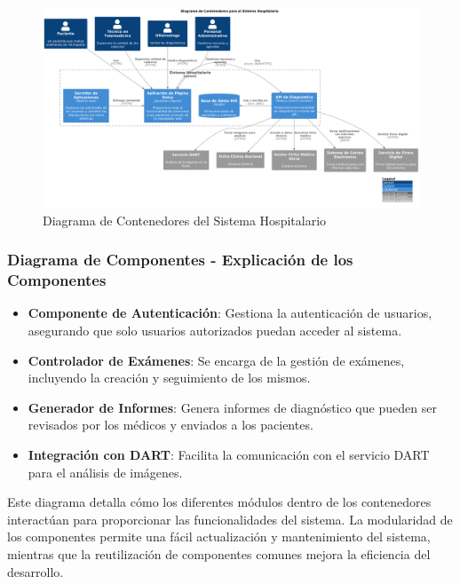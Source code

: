 \begin{figure}[h]
    \centering
    \includegraphics[width=\textwidth]{Pictures/container_diagram.png}
    \caption{Diagrama de Contenedores del Sistema Hospitalario}
    \label{fig:container_diagram}
\end{figure}










\subsubsection{Diagrama de Componentes - Explicación de los Componentes}

\begin{itemize}
    \item \textbf{Componente de Autenticación}: Gestiona la autenticación de usuarios, asegurando que solo usuarios autorizados puedan acceder al sistema.
    \item \textbf{Controlador de Exámenes}: Se encarga de la gestión de exámenes, incluyendo la creación y seguimiento de los mismos.
    \item \textbf{Generador de Informes}: Genera informes de diagnóstico que pueden ser revisados por los médicos y enviados a los pacientes.
    \item \textbf{Integración con DART}: Facilita la comunicación con el servicio DART para el análisis de imágenes.
\end{itemize}

Este diagrama detalla cómo los diferentes módulos dentro de los contenedores interactúan para proporcionar las funcionalidades del sistema. La modularidad de los componentes permite una fácil actualización y mantenimiento del sistema, mientras que la reutilización de componentes comunes mejora la eficiencia del desarrollo.


